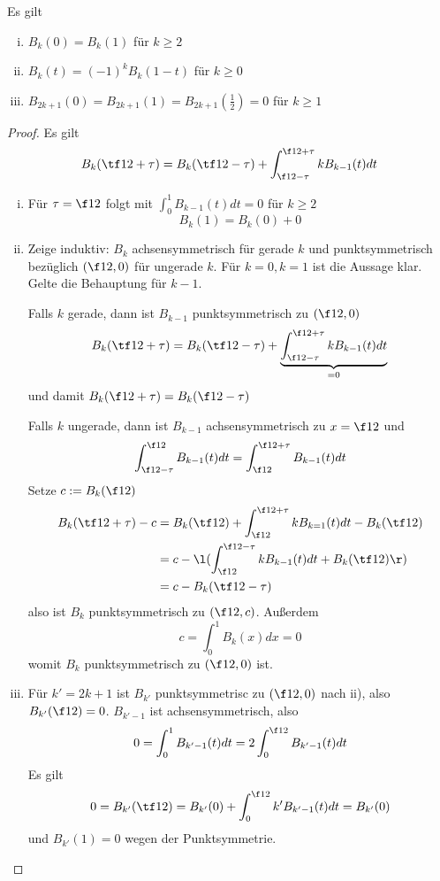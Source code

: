 \documentclass[11pt]{scrartcl}
\begin{document}
\begin{lem}[Eigenschaften]
	\label{2.35}
	Es gilt
	\begin{enumerate}[i)]
		\item
			$B_k(0) = B_k(1)$ für $k\ge 2$
		\item
			$B_k(t) = (-1)^k B_k(1-t)$ für $k\ge 0$
		\item
			$B_{2k+1}(0) = B_{2k+1}(1) = B_{2k+1}(\frac 12) = 0$ für $k\ge 1$
	\end{enumerate}
	\begin{proof}
		Es gilt
		\[
			B_k (\tf 12 + \tau) = B_k(\tf 12 - \tau)  + \int_{\f 12 - \tau}^{\f 12 + \tau} k B_{k-1}(t) dt
		\]
		\begin{enumerate}[i)]
			\item
				Für $\tau = \f 12$ folgt mit $\int_{0}^1 B_{k-1}(t) dt = 0$ für $k\ge 2$
				\[
					B_k(1) = B_k(0) + 0
				\]
			\item
				Zeige induktiv: $B_k$ achsensymmetrisch für gerade $k$ und punktsymmetrisch bezüglich $(\f 12,0)$ für ungerade $k$.
				Für $k=0, k=1$ ist die Aussage klar.
				Gelte die Behauptung für $k-1$.

				Falls $k$ gerade, dann ist $B_{k-1}$ punktsymmetrisch zu $(\f 12, 0)$
				\[
					B_k (\tf 12 + \tau) = B_k(\tf 12 - \tau)  + \underbrace{\int_{\f 12 - \tau}^{\f 12 + \tau} k B_{k-1}(t) dt}_{=0}
				\]
				und damit $B_k(\f 12 + \tau) = B_k(\f 12 - \tau)$

				Falls $k$ ungerade, dann ist $B_{k-1}$ achsensymmetrisch zu $x=\f 12$ und
				\[
					\int_{\f 12 - \tau}^{\f 12} B_{k-1}(t) dt = \int_{\f 12}^{\f 12 + \tau} B_{k-1}(t) dt
				\]
				Setze $c := B_k(\f 12)$
				\begin{align*}
					B_k(\tf 12 + \tau) - c 
					&= B_k (\tf 12) + \int_{\f 12}^{\f 12 + \tau} k B_{k=1}(t) dt - B_k(\tf 12) \\
					&= c - \l( \int_{\f 12}^{\f 12 - \tau} k B_{k-1}(t) dt + B_k( \tf 12) \r) \\
					&= c - B_k(\tf 12 - \tau)
				\end{align*}
				also ist $B_k$ punktsymmetrisch zu $(\f 12, c)$.
				Außerdem
				\[
					c = \int_{0}^1 B_k(x) dx = 0
				\]
				womit $B_k$ punktsymmetrisch zu $(\f 12,0)$ ist.
			\item
				Für $k'=2k+1$ ist $B_{k'}$ punktsymmetrisc zu $(\f 12,0)$ nach ii), also $B_{k'}(\f 12) = 0$.
				$B_{k'-1}$ ist achsensymmetrisch, also
				\[
					0 = \int_0^1 B_{k'-1}(t) dt = 2 \int_0^{\f 12} B_{k'-1} (t) dt 
				\]
				Es gilt
				\[
					0 = B_{k'}(\tf 12) = B_{k'}(0) + \int_{0}^{\f 12} k' B_{k'-1}(t) dt = B_{k'}(0)
				\]
				und $B_{k'}(1) = 0$ wegen der Punktsymmetrie.
		\end{enumerate}
	\end{proof}
\end{lem}
\end{document}

